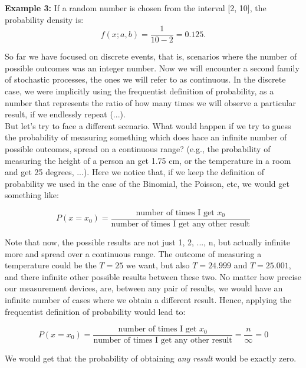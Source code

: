 \documentclass{book}
\begin{document}
\textbf{Example 3:} If a random number is chosen from the interval [2, 10], the probability density is:
\begin{equation}
    f(x; a, b) = \frac{1}{10-2} = 0.125.
\end{equation}

\newpage

So far we have focused on discrete events, that is, scenarios where the number of possible outcomes was an integer number. Now we will encounter a second family of stochastic processes, the ones we will refer to as continuous. In the discrete case, we were implicitly using the frequentist definition of probability, as a number that represents the ratio of how many times we will observe a particular result, if we endlessly repeat (...).\\

But let's try to face a different scenario. What would happen if we try to guess the probability of measuring something which does hace an infinite number of possible outcomes, spread on a continuous range? (e.g., the probability of measuring the height of a person an get 1.75 cm, or the temperature in a room and get 25 degrees, ...). Here we notice that, if we keep the definition of probability we used in the case of the Binomial, the Poisson, etc, we would get something like:

\begin{equation}
P(x = x_{0}) = \frac{\text{number of times I get $x_{0}$}}{\text{number of times I get any other result}}
\end{equation}

Note that now, the possible results are not just 1, 2, ..., n, but actually infinite more and spread over a continuous range. The outcome of measuring a temperature could be the $T = 25$ we want, but also $T = 24.999$ and $T = 25.001$, and there infinite other possible results between these two. No matter how precise our measurement devices, are, between any pair of results, we would have an infinite number of cases where we obtain a different result. Hence, applying the frequentist definition of probability would lead to:

\begin{equation}
P(x = x_{0}) = \frac{\text{number of times I get $x_{0}$}}{\text{number of times I get any other result}} = \frac{n}{\infty} = 0
\end{equation}

We would get that the probability of obtaining \textit{any result} would be exactly zero.\\
\end{document}
